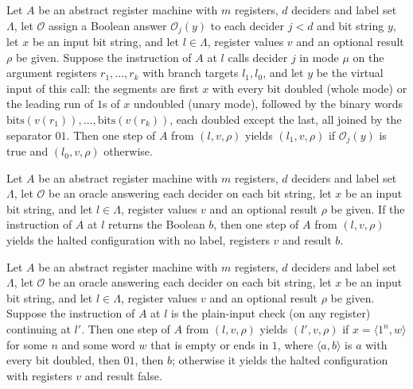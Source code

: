 \begin{lemma}
\label{Complexity.LogProg.astep_call}
\leanok
{}
Let $A$ be an abstract register machine with $m$ registers, $d$ deciders and label set
$\Lambda$, let $\mathcal{O}$ assign a Boolean answer $\mathcal{O}_j(y)$ to each decider
$j<d$ and bit string $y$, let $x$ be an input bit string, and let $l\in\Lambda$, register
values $v$ and an optional result $\rho$ be given. Suppose the instruction of $A$ at $l$
calls decider $j$ in mode $\mu$ on the argument registers $r_1,\dots,r_k$ with branch
targets $l_1,l_0$, and let $y$ be the virtual input of this call: the segments are first
$x$ with every bit doubled (whole mode) or the leading run of $1$s of $x$ undoubled
(unary mode), followed by the binary words $\mathrm{bits}(v(r_1)),\dots,
\mathrm{bits}(v(r_k))$, each doubled except the last, all joined by the separator $01$.
Then one step of $A$ from $(l,v,\rho)$ yields $(l_1,v,\rho)$ if $\mathcal{O}_j(y)$ is
true and $(l_0,v,\rho)$ otherwise.
\end{lemma}

\begin{lemma}
\label{Complexity.LogProg.astep_ret}
\leanok
{}
Let $A$ be an abstract register machine with $m$ registers, $d$ deciders and label set
$\Lambda$, let $\mathcal{O}$ be an oracle answering each decider on each bit string, let
$x$ be an input bit string, and let $l\in\Lambda$, register values $v$ and an optional
result $\rho$ be given. If the instruction of $A$ at $l$ returns the Boolean $b$, then
one step of $A$ from $(l,v,\rho)$ yields the halted configuration with no label,
registers $v$ and result $b$.
\end{lemma}

\begin{lemma}
\label{Complexity.LogProg.astep_valP}
\leanok
{}
Let $A$ be an abstract register machine with $m$ registers, $d$ deciders and label set
$\Lambda$, let $\mathcal{O}$ be an oracle answering each decider on each bit string, let
$x$ be an input bit string, and let $l\in\Lambda$, register values $v$ and an optional
result $\rho$ be given. Suppose the instruction of $A$ at $l$ is the plain-input check
(on any register) continuing at $l'$. Then one step of $A$ from $(l,v,\rho)$ yields
$(l',v,\rho)$ if $x=\langle 1^n,w\rangle$ for some $n$ and some word $w$ that is empty or
ends in $1$, where $\langle a,b\rangle$ is $a$ with every bit doubled, then $01$, then
$b$; otherwise it yields the halted configuration with registers $v$ and result false.
\end{lemma}

